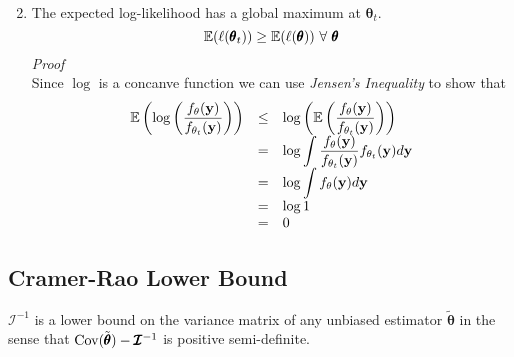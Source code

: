 \documentclass[11pt,a4paper]{article}
\begin{document}
\begin{enumerate}
\[\begin{array}{rrcl}
	\end{array}\]
	\item The expected log-likelihood has a global maximum at $\pmb\theta_t$. $$\expect(\ell(\pmb\theta_t))\geq\expect(\ell(\pmb\theta))\ \forall\ \pmb\theta$$
	\textit{Proof}\\
	Since $\log$ is a concanve function we can use \textit{Jensen's Inequality} to show that
	\[\begin{array}{rcl}
	\mathbb{E}\left(\log\left(\dfrac{f_\theta(\textbf{y})}{f_{\theta_t}(\textbf{y})}\right)\right)&\leq&\log\left(\mathbb{E}\left(\dfrac{f_\theta(\textbf{y})}{f_{\theta_t}(\textbf{y})}\right)\right)\\
	&=&\log\displaystyle\int\dfrac{f_\theta(\textbf{y})}{f_{\theta_t}(\textbf{y})}f_{\theta_t}(\textbf{y})d\textbf{y}\\
	&=&\log\displaystyle\int f_\theta(\textbf{y})d\textbf{y}\\
	&=&\log1\\
	&=&0
	\end{array}\]
\end{enumerate}

\subsection{Cramer-Rao Lower Bound}

$\pmb{\mathcal{I}}^{-1}$ is a lower bound on the variance matrix of any unbiased estimator $\tilde{\pmb\theta}$ in the sense that $\mathrm{Cov}(\tilde{\pmb\theta})-\pmb{\mathcal{I}}^{-1}$ is positive semi-definite.\\
\end{document}
